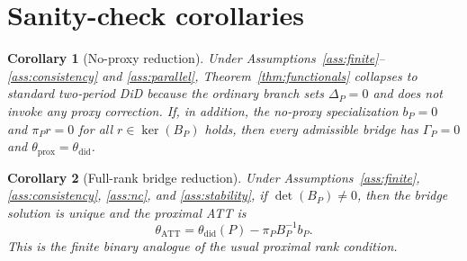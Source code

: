 \documentclass[11pt]{article}
\theoremstyle{definition}
\theoremstyle{plain}
\newtheorem{corollary}{Corollary}
\theoremstyle{remark}
\begin{document}
\section{Sanity-check corollaries}
\begin{corollary}[No-proxy reduction]\label{cor:noproxy}
Under Assumptions~\ref{ass:finite}--\ref{ass:consistency} and \ref{ass:parallel}, Theorem~\ref{thm:functionals} collapses to standard two-period DiD because the ordinary branch sets \(\Delta_P=0\) and does not invoke any proxy correction.  If, in addition, the no-proxy specialization \(b_P=0\) and \(\pi_Pr=0\) for all \(r\in\operatorname{ker}(B_P)\) holds, then every admissible bridge has \(\Gamma_P=0\) and \(\theta_{\mathrm{prox}}=\theta_{\mathrm{did}}\).
\end{corollary}

\begin{corollary}[Full-rank bridge reduction]\label{cor:fullrank}
Under Assumptions~\ref{ass:finite}, \ref{ass:consistency}, \ref{ass:nc}, and \ref{ass:stability}, if \(\det(B_P)\neq0\), then the bridge solution is unique and the proximal ATT is
\[
\theta_{\mathrm{ATT}}=\theta_{\mathrm{did}}(P)-\pi_PB_P^{-1}b_P.
\]
This is the finite binary analogue of the usual proximal rank condition.
\end{corollary}
\end{document}
